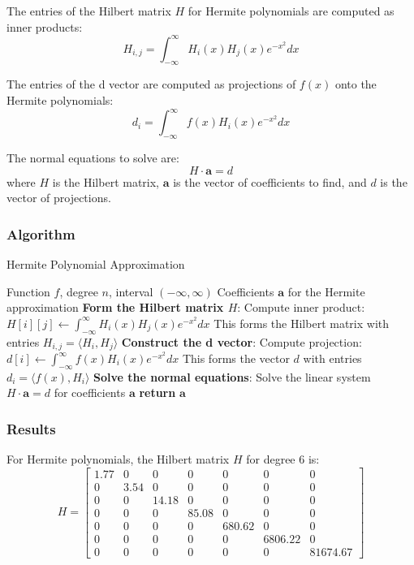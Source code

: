 \documentclass[10pt]{article}
\begin{document}
The entries of the Hilbert matrix \( H \) for Hermite polynomials are computed as inner products:
\begin{equation}
H_{i,j} = \int_{-\infty}^{\infty} H_i(x) H_j(x) e^{-x^2} dx
\end{equation}

The entries of the d vector are computed as projections of \( f(x) \) onto the Hermite polynomials:
\begin{equation}
d_i = \int_{-\infty}^{\infty} f(x) H_i(x) e^{-x^2} dx
\end{equation}

The normal equations to solve are:
\begin{equation}
H \cdot \mathbf{a} = d
\end{equation}
where \( H \) is the Hilbert matrix, \( \mathbf{a} \) is the vector of coefficients to find, and \( d \) is the vector of projections.

\subsubsection{Algorithm}
\begin{algorithm}[H]
\caption{Hermite Polynomial Approximation}\label{alg:hermite}
\begin{algorithmic}
\Require Function $f$, degree $n$, interval $(-\infty, \infty)$
\Ensure Coefficients $\mathbf{a}$ for the Hermite approximation
\State \textbf{Form the Hilbert matrix $H$}:
        \State Compute inner product: $H[i][j] \gets \int_{-\infty}^{\infty} H_i(x) H_j(x) e^{-x^2} dx$
        \State This forms the Hilbert matrix with entries $H_{i,j} = \langle H_i, H_j \rangle$
    \EndFor
\EndFor
\State \textbf{Construct the d vector}:
    \State Compute projection: $d[i] \gets \int_{-\infty}^{\infty} f(x) H_i(x) e^{-x^2} dx$
    \State This forms the vector $d$ with entries $d_i = \langle f(x), H_i \rangle$
\EndFor
\State \textbf{Solve the normal equations}:
\State Solve the linear system $H \cdot \mathbf{a} = d$ for coefficients $\mathbf{a}$
\State \textbf{return} $\mathbf{a}$
\end{algorithmic}
\end{algorithm}

\subsubsection{Results}

For Hermite polynomials, the Hilbert matrix \( H \) for degree 6 is:
\[
H = \begin{bmatrix}
1.77 & 0 & 0 & 0 & 0 & 0 & 0 \\
0 & 3.54 & 0 & 0 & 0 & 0 & 0 \\
0 & 0 & 14.18 & 0 & 0 & 0 & 0 \\
0 & 0 & 0 & 85.08 & 0 & 0 & 0 \\
0 & 0 & 0 & 0 & 680.62 & 0 & 0 \\
0 & 0 & 0 & 0 & 0 & 6806.22 & 0 \\
0 & 0 & 0 & 0 & 0 & 0 & 81674.67
\end{bmatrix}
\]
\end{document}
